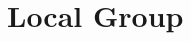 \documentclass[english, oneside]{HYgradu}
\begin{document}
\section{Local Group}
%
%
%
%
\end{document}
